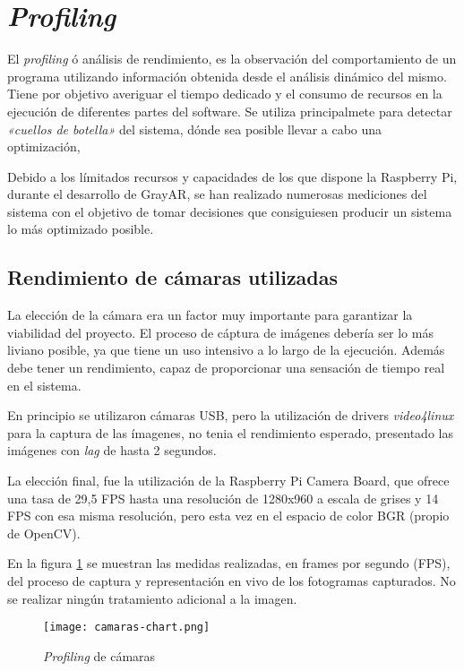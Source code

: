 \section{\textit{Profiling}}

El \textit{profiling} ó análisis de rendimiento, es la observación del comportamiento de un programa utilizando información obtenida desde el análisis dinámico del mismo. Tiene por objetivo averiguar el tiempo dedicado y el consumo de recursos en la ejecución de diferentes partes del software. Se utiliza principalmete para detectar \textit{«cuellos de botella»} del sistema, dónde sea posible llevar a cabo una optimización,

Debido a los límitados recursos y capacidades de los que dispone la Raspberry Pi, durante el desarrollo de GrayAR, se han realizado numerosas mediciones del sistema con el objetivo de tomar decisiones que consiguiesen producir un sistema lo más optimizado posible.

\subsection{Rendimiento de cámaras utilizadas}
La elección de la cámara era un factor muy importante para garantizar la viabilidad del proyecto. El proceso de cáptura de imágenes debería ser lo más liviano posible, ya que tiene un uso intensivo a lo largo de la ejecución. Además debe tener un rendimiento, capaz de proporcionar una sensación de tiempo real en el sistema. 

En principio se utilizaron cámaras USB, pero la utilización de drivers \textit{video4linux} para la captura de las ímagenes, no tenia el rendimiento esperado, presentado las imágenes con \textit{lag} de hasta 2 segundos.

La elección final, fue la utilización de la Raspberry Pi Camera Board, que ofrece una tasa de 29,5 FPS hasta una resolución de 1280x960 a escala de grises y 14 FPS con esa misma resolución, pero esta vez en el espacio de color BGR (propio de OpenCV).

En la figura \ref{fig:camaras_chart} se muestran las medidas realizadas, en frames por segundo (FPS), del proceso de captura y representación en vivo de los fotogramas capturados. No se realizar ningún tratamiento adicional a la imagen.

\begin{figure}
  \begin{center}
    \texttt{[image: camaras-chart.png]}
    \caption{\textit{Profiling} de cámaras}
    \label{fig:camaras_chart}
  \end{center}
\end{figure}

